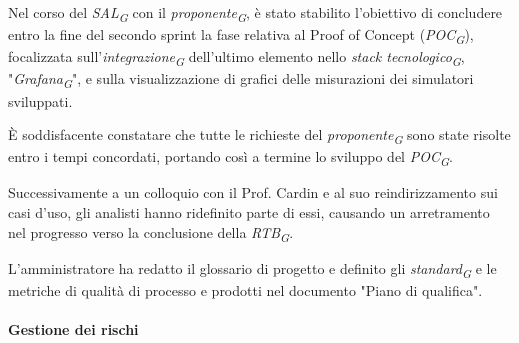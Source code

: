 Nel corso del \textit{SAL}\textsubscript{\textit{G}} con il \textit{proponente}\textsubscript{\textit{G}}, è stato stabilito l'obiettivo di concludere entro la fine del secondo sprint la fase relativa al Proof of Concept (\textit{POC}\textsubscript{\textit{G}}), focalizzata sull'\textit{integrazione}\textsubscript{\textit{G}} dell'ultimo elemento nello \textit{stack tecnologico}\textsubscript{\textit{G}}, "\textit{Grafana}\textsubscript{\textit{G}}", e sulla visualizzazione di grafici delle misurazioni dei simulatori sviluppati.

È soddisfacente constatare che tutte le richieste del \textit{proponente}\textsubscript{\textit{G}} sono state risolte entro i tempi concordati, portando così a termine lo sviluppo del \textit{POC}\textsubscript{\textit{G}}.

Successivamente a un colloquio con il Prof. Cardin e al suo reindirizzamento sui casi d'uso, gli analisti hanno ridefinito parte di essi, causando un arretramento nel progresso verso la conclusione della \textit{RTB}\textsubscript{\textit{G}}.

L'amministratore ha redatto il glossario di progetto e definito gli \textit{standard}\textsubscript{\textit{G}} e le metriche di qualità di processo e prodotti nel documento "Piano di qualifica".

\paragraph{Gestione dei rischi} 


